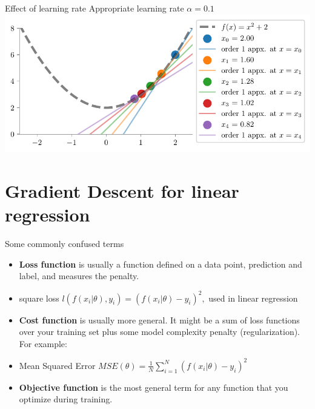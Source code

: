 \documentclass[usenames,dvipsnames]{beamer}
\begin{document}
    \begin{frame}{Effect of learning rate}
        Appropriate learning rate $\alpha=0.1$
        \includegraphics[scale=0.8]{../figures/mml/gd-lr-0.1.pdf}
      \end{frame}

  \section{Gradient Descent for linear regression}
  \begin{frame}{Some commonly confused terms}

    \begin{itemize}[<+->]
        \item \textbf{Loss function} is usually a function defined on a data point, prediction and label, and measures the penalty. 
        \item square loss \(l\left(f\left(x_{i} | \theta\right), y_{i}\right)=\left(f\left(x_{i} | \theta\right)-y_{i}\right)^{2},\) used in linear regression
        \item \textbf{Cost function} is usually more general. It might be a sum of loss functions over your training set plus some model complexity penalty (regularization). For example:
        \item Mean Squared Error \(M S E(\theta)=\frac{1}{N} \sum_{i=1}^{N}\left(f\left(x_{i} | \theta\right)-y_{i}\right)^{2}\)
        \item \textbf{Objective function} is the most general term for any function that you optimize during training.
    \end{itemize}
    
    \end{frame}
\end{document}
